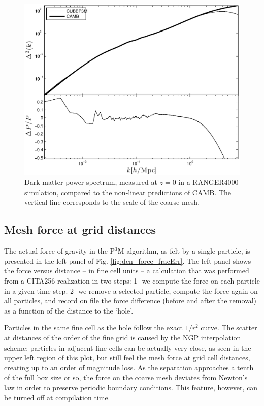 \begin{figure}%
  \begin{center}
    \includegraphics[width=5.2in]{graphs/power_highres.eps}
  \caption{Dark matter power spectrum, measured at $z=0$ in a RANGER4000 simulation,
  compared to the non-linear predictions of {\small CAMB}. 
  The vertical line corresponds to the scale of the coarse mesh.
    \label{fig:power_highres}}
\end{center}
\end{figure}

\subsection{Mesh force at grid distances}
\label{subsec:force}

The actual force of gravity in the P$^3$M algorithm,
as felt by a single particle, is presented in the left panel of Fig. \ref{fig:den_force_fracErr}.
The left panel shows the force versus distance -- in fine cell units -- a calculation that was performed from a CITA256 realization in two steps: 
1- we compute the force on each particle in a given time step.
2- we remove a selected particle, compute the force again on all particles, and record on file the 
force difference (before  and after the removal) as a function of the distance to the `hole'.

Particles in the same fine cell as the hole follow the exact $1/r^{2}$ curve. The scatter at 
  distances of the order of the fine grid is caused by the NGP interpolation scheme:
  particles in adjacent fine cells can be actually very close, as seen in the upper left region of this plot,
  but still feel the mesh force at grid cell distances,
  creating up to an order of magnitude loss.
As the separation approaches a tenth of the full box size or so, the force on the coarse mesh deviates
from Newton's law in order to preserve periodic boundary conditions. 
This feature, however, can be turned off at compilation time.


